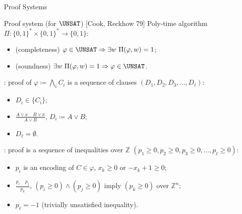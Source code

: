 \begin{frame}{Proof Systems}

    \begin{block}{Proof system (for $\UNSAT$) [Cook, Reckhow 79]}
        Poly-time algorithm $\Pi\colon \{0, 1\}^* \times \{0, 1\}^* \rightarrow \{0, 1\}$:
        \begin{itemize}
            \item (completeness) $\varphi \in \UNSAT \Rightarrow \exists w ~ \Pi(\varphi, w) = 1$;
            \item (soundness) $\exists w ~ \Pi(\varphi, w) = 1 \Rightarrow \varphi \in \UNSAT$.
        \end{itemize}
    \end{block}

    : proof of $\varphi \coloneqq \bigwedge\limits_{i} C_i$ is a sequence of clauses
    $(D_1, D_2, D_3, \dots, D_{\ell})$:
    \pause
    
    \begin{minipage}{0.3\linewidth}
        \begin{itemize}
            \item $D_i \in \{C_i\}$;
                \pause
            \item $\frac{A \lor x ~~~~~ B \lor \bar{x}}{A \lor B}$, $D_i \coloneqq A \lor B$;
                \pause
            \item $D_{\ell} = \emptyset$.
        \end{itemize}
    \end{minipage}
    \pause
    \begin{minipage}{0.68\linewidth}
        \centering
        
    \end{minipage}


    \pause
    \vspace{0.3cm}

    : proof is a sequence of inequalities over $\mathbb{Z}$
    $(p_1 \ge 0, p_2 \ge 0, p_3 \ge 0, \dots, p_{\ell} \ge 0)$:
    \begin{itemize}
        \item $p_i$ is an encoding of $C \in \varphi$, $x_k \ge 0$ or $-x_k + 1 \ge 0$;
        \item $\frac{p_i ~~~~~ p_j}{p_k}$,  $(p_i \ge 0) \land (p_j \ge 0)$ imply $(p_k \ge 0)$
            \alert{over $\mathbb{Z}^n$};
        \item $p_{\ell} = -1$ (trivially unsatisfied inequality).
    \end{itemize}


\end{frame}


